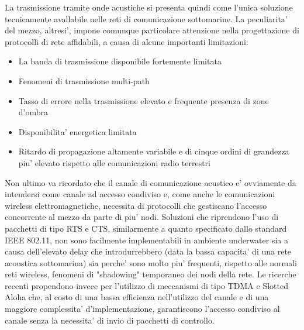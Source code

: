 La trasmissione tramite onde acustiche si presenta quindi come l'unica soluzione tecnicamente avallabile nelle reti di comunicazione sottomarine. La peculiarita' del mezzo, altresi', impone comunque particolare attenzione nella progettazione di protocolli di rete affidabili, a causa di alcune importanti limitazioni:
\begin{itemize}

\item La banda di trasmissione disponibile fortemente limitata

\item Fenomeni di trasmissione multi-path

\item Tasso di errore nella trasmissione elevato e frequente presenza di zone d'ombra

\item Disponibilita' energetica limitata

\item Ritardo di propagazione altamente variabile e di cinque ordini di grandezza piu' elevato rispetto alle comunicazioni radio terrestri
\end{itemize}

Non ultimo va ricordato che il canale di comunicazione acustico e' ovviamente da intendersi come canale ad accesso condiviso e, come anche le comunicazioni wireless elettromagnetiche, necessita di protocolli che gestiscano l'accesso concorrente al mezzo da parte di piu' nodi. Soluzioni che riprendono l'uso di pacchetti di tipo RTS e CTS, similarmente a quanto specificato dallo standard IEEE 802.11, non sono facilmente implementabili in ambiente underwater sia a causa dell'elevato delay che introdurrebbero (data la bassa capacita' di una rete acoustica sottomarina) sia perche' sono molto piu' frequenti, rispetto alle normali reti wireless, fenomeni di "shadowing" temporaneo dei nodi della rete. Le ricerche recenti propendono invece per l'utilizzo di meccanismi di tipo TDMA e Slotted Aloha che, al costo di una bassa efficienza nell'utilizzo del canale e di una maggiore complessita' d'implementazione, garantiscono l'accesso condiviso al canale senza la necessita' di invio di pacchetti di controllo.

